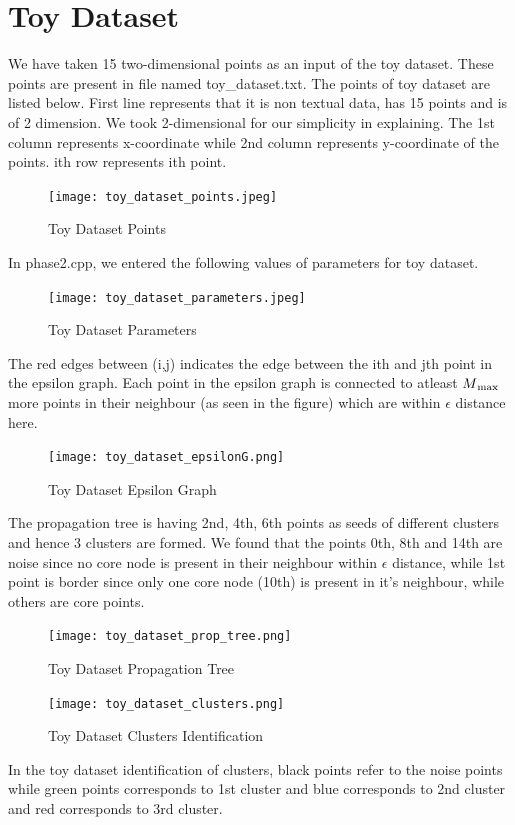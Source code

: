 \documentclass[acmsmall]{acmart}
\begin{document}
\section*{Toy Dataset}
We have taken 15 two-dimensional points as an input of the toy dataset. These points are present in file named toy\_dataset.txt. \newline
The points of toy dataset are listed below. First line represents that it is non textual data, has 15 points and is of 2 dimension. We took 2-dimensional for our simplicity in explaining. \newline
The 1st column represents x-coordinate while 2nd column represents y-coordinate of the points. ith row represents ith point. \newline
\begin{figure} [!h]
    \texttt{[image: toy\_dataset\_points.jpeg]}
    \caption{Toy Dataset Points} 
\end{figure}
In phase2.cpp, we entered the following values of parameters for toy dataset. \newline
\begin{figure} [!h]
    \texttt{[image: toy\_dataset\_parameters.jpeg]}
    \caption{Toy Dataset Parameters} 
\end{figure}
The red edges between (i,j) indicates the edge between the ith and jth point in the epsilon graph. Each point in the epsilon graph is connected to atleast $M\textsubscript{max}$ more points in their neighbour (as seen in the figure) which are within $\epsilon$ distance here. \newline
\begin{figure} [!h]
    \texttt{[image: toy\_dataset\_epsilonG.png]}
    \caption{Toy Dataset Epsilon Graph} 
\end{figure}
The propagation tree is having 2nd, 4th, 6th points as seeds of different clusters and hence 3 clusters are formed. \newline
We found that the points 0th, 8th and 14th are noise since no core node is present in their neighbour within $\epsilon$ distance, while 1st point is border since only one core node (10th) is present in it's neighbour, while others are core points.
\begin{figure} [!h]
    \texttt{[image: toy\_dataset\_prop\_tree.png]}
    \caption{Toy Dataset Propagation Tree} 
\end{figure}
\begin{figure} [!h]
    \texttt{[image: toy\_dataset\_clusters.png]}
    \caption{Toy Dataset Clusters Identification} 
\end{figure}
In the toy dataset identification of clusters, black points refer to the noise points while green points corresponds to 1st cluster and blue corresponds to 2nd cluster and red corresponds to 3rd cluster.
\end{document}
